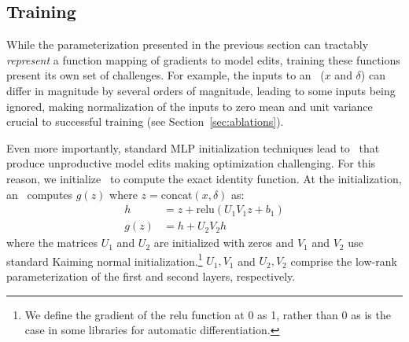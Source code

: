 \documentclass{article}
\begin{document}
\subsection{Training \name}
While the parameterization presented in the previous section can tractably \textit{represent} a function mapping of gradients to model edits, training these functions
present its own set of challenges. 
For example, the inputs to an \name~($x$ and $\delta$) can differ in magnitude by several orders of magnitude, leading to some inputs being ignored, making normalization of the inputs to zero mean and unit variance crucial to successful training (see Section~\ref{sec:ablations}). 


Even more importantly, standard MLP initialization techniques lead to \name~that produce unproductive model edits making optimization challenging. For this reason, we initialize \name~to compute the exact identity function. At the initialization, an \name~computes $g(z)$ where $z=\text{concat}(x, \delta)$ as:
\begin{align}
    h &= z + \text{relu}(U_1V_1 z + b_1) \\
    g(z) &= h + U_2V_2 h
\end{align}
where the matrices $U_1$ and $U_2$ are initialized with zeros and $V_1$ and $V_2$ use standard Kaiming normal initialization.\footnote{We define the gradient of the relu function at 0 as 1, rather than 0 as is the case in some libraries for automatic differentiation.}
$U_1,V_1$ and $U_2,V_2$ comprise the low-rank parameterization of the first and second layers, respectively.
\end{document}
